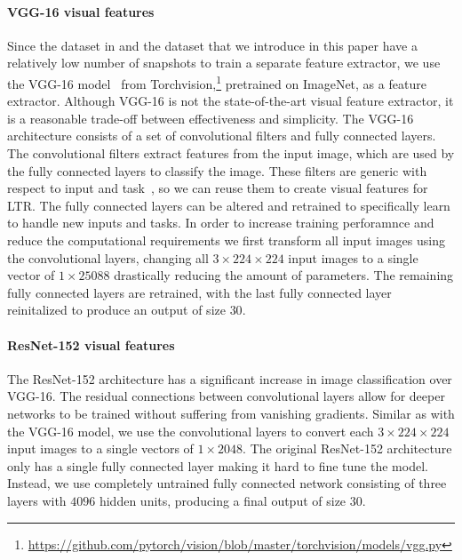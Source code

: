 \paragraph{VGG-16 visual features}
Since the dataset in \citep{fan2017learning} and the \datasetname{} dataset that we introduce in this paper have a relatively low number of snapshots to train a separate feature extractor, we use the VGG-16 model~\cite{simonyan2014very} from Torchvision,\footnote{\url{https://github.com/pytorch/vision/blob/master/torchvision/models/vgg.py}} pretrained on ImageNet, as a feature extractor. 
Although VGG-16 is not the state-of-the-art visual feature extractor, it is a reasonable trade-off between effectiveness and simplicity.
The VGG-16 architecture consists of a set of convolutional filters and fully connected layers. 
The convolutional filters extract features from the input image, which are used by the fully connected layers to classify the image. 
These filters are generic with respect to input and task~\citep{donahue2014decaf}, so we can reuse them to create visual features for LTR. 
The fully connected layers can be altered and retrained to specifically learn to handle new inputs and tasks. In order to increase training perforamnce and reduce the computational requirements we first transform all input images using the convolutional layers, changing all $3\times224\times224$ input images to a single vector of $1\times25088$ drastically reducing the amount of parameters. The remaining fully connected layers are retrained, with the last fully connected layer reinitalized to produce an output of size $30$.


\paragraph{ResNet-152 visual features}
The ResNet-152 architecture has a significant increase in image classification over VGG-16\cite{he2016deep}. The residual connections between convolutional layers allow for deeper networks to be trained without suffering from vanishing gradients. Similar as with the VGG-16 model, we use the convolutional layers to convert each $3\times224\times224$ input images to a single vectors of $1\times2048$. The original ResNet-152 architecture only has a single fully connected layer making it hard to fine tune the model. Instead, we use completely untrained fully connected network consisting of three layers with $4096$ hidden units, producing a final output of size $30$.


